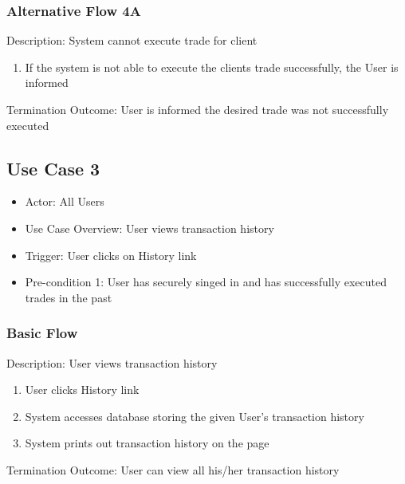 \documentclass{article}
\begin{document}
\subsubsection{Alternative Flow 4A}
Description: System cannot execute trade for client
\begin{enumerate}
\item If the system is not able to execute the clients trade successfully, the User is informed
\end{enumerate}
Termination Outcome: User is informed the desired trade was not successfully executed

\subsection{Use Case 3}
\begin{itemize}
\item Actor: All Users
\item Use Case Overview:  User views transaction history
\item Trigger: User clicks on History link
\item Pre-condition 1: User has securely singed in and has successfully executed trades in the past
\end{itemize}

\subsubsection{Basic Flow}
Description: User views transaction history
\begin{enumerate}
\item User clicks History link
\item System accesses database storing the given User's transaction history
\item System prints out transaction history on the page 
\end{enumerate}
Termination Outcome: User can view all his/her transaction history
\end{document}
